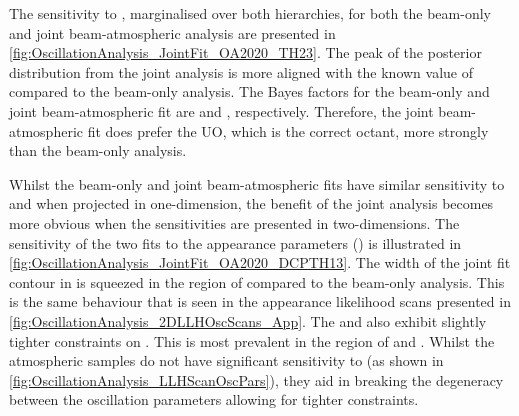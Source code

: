 The sensitivity to , marginalised over both hierarchies, for both the beam-only and joint beam-atmospheric analysis are presented in \autoref{fig:OscillationAnalysis_JointFit_OA2020_TH23}. The peak of the posterior distribution from the joint analysis is more aligned with the known value of  compared to the beam-only analysis.
The Bayes factors for the beam-only and joint beam-atmospheric fit are  and , respectively. Therefore, the joint beam-atmospheric fit does prefer the UO, which is the correct octant, more strongly than the beam-only analysis.

Whilst the beam-only and joint beam-atmospheric fits have similar sensitivity to  and  when projected in one-dimension, the benefit of the joint analysis becomes more obvious when the sensitivities are presented in two-dimensions. The sensitivity of the two fits to the appearance parameters () is illustrated in \autoref{fig:OscillationAnalysis_JointFit_OA2020_DCPTH13}. The width of the  joint fit contour in  is squeezed in the region of  compared to the beam-only analysis. This is the same behaviour that is seen in the appearance likelihood scans presented in \autoref{fig:OscillationAnalysis_2DLLHOscScans_App}. The \quickmath{1\sigma} and  also exhibit slightly tighter constraints on . This is most prevalent in the region of  and . Whilst the atmospheric samples do not have significant sensitivity to  (as shown in \autoref{fig:OscillationAnalysis_LLHScanOscPars}), they aid in breaking the degeneracy between the oscillation parameters allowing for tighter constraints.

